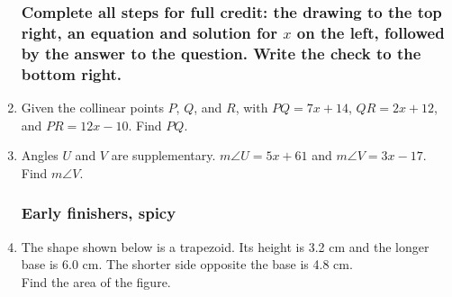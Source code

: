 \documentclass[12pt, twoside]{article}
\begin{document}
\begin{enumerate}
\newpage

\subsubsection*{Complete all steps for full credit: the drawing to the top right, an equation and solution for $x$ on the left, followed by the answer to the question. Write the check to the bottom right.}

  \item Given the collinear points $P$, $Q$, and $R$, with $PQ=7x+14$, $QR=2x+12$, and $PR=12x-10$. Find ${PQ}$.
  \vspace{9cm}

  \item Angles $U$ and $V$ are supplementary. $m\angle U = 5x+61$ and $m\angle V = 3x-17$. Find $m\angle V$. \vspace{7cm}


\newpage
\subsubsection*{Early finishers, spicy}

  \item The shape shown below is a trapezoid. Its height is 3.2 cm and the longer base is 6.0 cm. The shorter side opposite the base is 4.8 cm. \\[0.25cm]
  Find the area of the figure.
  \begin{flushright} 
  \end{flushright} 
  \vspace{4cm}



\end{enumerate}
\end{document}
